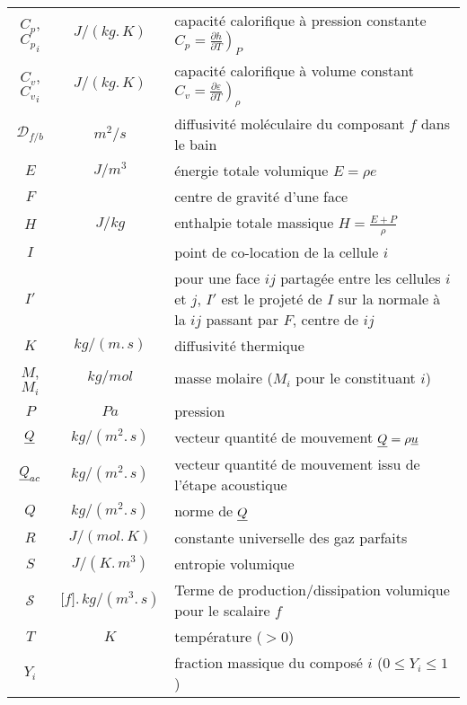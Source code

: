 \begin{table}[h!]
\begin{tabular}{ccp{}}
$C_p$, ${C_p}_i$ & $J/(kg.\,K)$        & capacité calorifique à pression constante
        $C_p = \left.\frac{\partial h}{\partial T}\right)_P$\\
$C_v$, ${C_v}_i$ & $J/(kg.\,K)$        & capacité calorifique à volume constant
        $C_v = \left.\frac{\partial \varepsilon}{\partial T}\right)_\rho$\\
$\mathcal{D}_{f/b}$ & $m^2/s$         & diffusivité moléculaire du composant $f$
                                        dans le bain\\
$E$                 & $J/m^3$        & énergie totale volumique $E = \rho e$\\
$F$                 &                  & centre de gravité d'une face\\
$H$                 & $J/kg$         & enthalpie totale massique
                                        $H = \frac{E+P}{\rho}$\\
$I$                 &                  & point de co-location de la cellule $i$\\
$I'$                 &                  & pour une face $ij$ partagée entre les
                                        cellules $i$ et $j$, $I'$
                                        est le projeté de $I$ sur la
                                        normale à la $ij$ passant
                                        par $F$, centre de $ij$\\
$K$                 & $kg/(m.\,s)$         & diffusivité thermique\\
$M$, $M_i$         & $kg/mol$         & masse molaire ($M_i$ pour le constituant $i$)\\
$P$                 & $Pa$                 & pression\\
$\underline{Q}$         & $kg/(m^2.\,s)$& vecteur quantité de mouvement
                                        $\underline{Q} = \rho\underline{u}$\\
$\underline{Q}_{ac}$ & $kg/(m^2.\,s)$& vecteur quantité de mouvement issu
                                        de l'étape acoustique\\
$Q$                 & $kg/(m^2.\,s)$& norme de $\underline{Q}$\\
$R$                 & $J/(mol.\,K)$ & constante universelle des gaz parfaits\\
$S$                 & $J/(K.\,m^3)$        & entropie volumique\\
$\mathcal{S}$         & $\lbrack f\rbrack.\,kg/(m^3.\,s)$
                                & Terme de production/dissipation volumique
                                        pour le scalaire $f$\\
$T$                 & $K$                 & température ($>0$)\\
$Y_i$                 &                 & fraction massique du composé $i$
                                        ($0 \leqslant Y_i \leqslant 1$)\\
\end{tabular}
\end{table}

